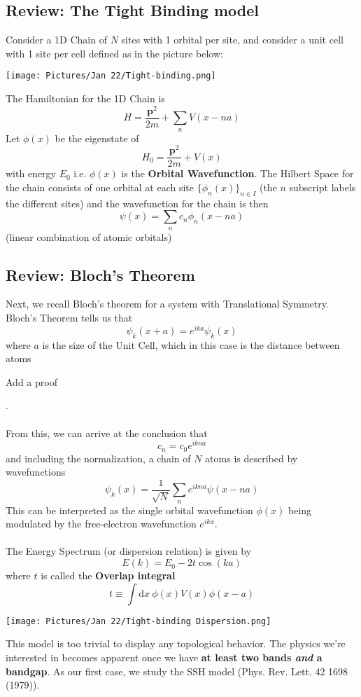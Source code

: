 \documentclass[11pt]{article}
\begin{document}
\vskip 1cm
\subsection{Review: The Tight Binding model}
Consider a 1D Chain of $N$ sites with 1 orbital per site, and consider a unit cell with 1 site per cell defined as in the picture below:
\begin{center}
  \texttt{[image: Pictures/Jan 22/Tight-binding.png]}
\end{center} The Hamiltonian for the 1D Chain is $$ H = \frac{\mathbf{p}^2}{2m} + \sum_{n} V(x-na) $$ Let $\phi(x)$ be the eigenstate of $$ H_0 = \frac{\mathbf{p}^2}{2m} + V(x) $$ with energy $E_0$ i.e. $\phi(x)$ is the \textbf{Orbital Wavefunction}. The Hilbert Space for the chain consists of one orbital at each site $\{\phi_n(x)\}_{n \in I}$ (the $n$ subscript labels the different sites) and the wavefunction for the chain is then $$ \boxed{\psi(x) = \sum_{n} c_n \phi_n(x - na)} $$ (linear combination of atomic orbitals) 

\vskip 1cm
\subsection{Review: Bloch's Theorem}
Next, we recall Bloch's theorem for a system with Translational Symmetry. Bloch's Theorem tells us that $$ \boxed{ \psi_k(x+a) = e^{ika} \psi_k(x) } $$ where $a$ is the size of the Unit Cell, which in this case is the distance between atoms \begin{note} {Add a proof} \end{note}.
\\
\\
From this, we can arrive at the conclusion that $$ c_n = c_0 e^{ikna} $$ and including the normalization, a chain of $N$ atoms is described by wavefunctions $$ \boxed{\psi_k(x) = \frac{1}{\sqrt{N}} \sum_{n} e^{ikna} \psi(x-na)  } $$ This can be interpreted as the single orbital wavefunction $\phi(x)$ being modulated by the free-electron wavefunction $e^{ikx}$.
\\
\\
The Energy Spectrum (or dispersion relation) is given by $$ E(k) = E_0 - 2t \cos(ka) $$ where $t$ is called the \textbf{Overlap integral} $$ t \equiv \int \mathrm{d}x ~ \phi(x) V(x) \phi(x-a) $$ \begin{center}
  \texttt{[image: Pictures/Jan 22/Tight-binding Dispersion.png]}
\end{center} This model is too trivial to display any topological behavior. The physics we're interested in becomes apparent once we have \textbf{at least two bands \emph{and} a bandgap}. As our first case, we study the SSH model (Phys. Rev. Lett. 42 1698 (1979)).
\end{document}
